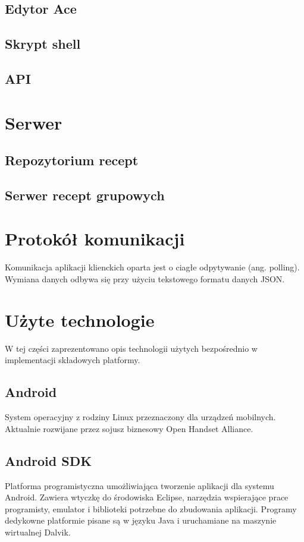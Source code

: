 \documentclass[11pt,a4paper,polish,thesis]{dcsbook}
\begin{document}
\subsection{Edytor Ace}
\subsection{Skrypt shell}       %
\subsection{API}
\section{Serwer}
\subsection{Repozytorium recept}
\subsection{Serwer recept grupowych}
\section{Protokół komunikacji}
Komunikacja aplikacji klienckich oparta jest o ciagłe odpytywanie (ang. polling). 
Wymiana danych odbywa się przy użyciu tekstowego formatu danych JSON. 






\section{Użyte technologie}
W tej części zaprezentowano opis technologii użytych bezpośrednio w implementacji składowych platformy.
\subsection{Android}
System operacyjny z rodziny Linux przeznaczony dla urządzeń mobilnych. Aktualnie rozwijane przez sojusz biznesowy Open Handset Alliance.
\subsection{Android SDK}
Platforma programistyczna umożliwiająca tworzenie aplikacji dla systemu Android. Zawiera wtyczkę do środowiska Eclipse, narzędzia wspierające prace programisty, emulator i biblioteki potrzebne do zbudowania aplikacji. Programy dedykowne platformie pisane są w języku Java i uruchamiane na maszynie wirtualnej Dalvik.
\end{document}
